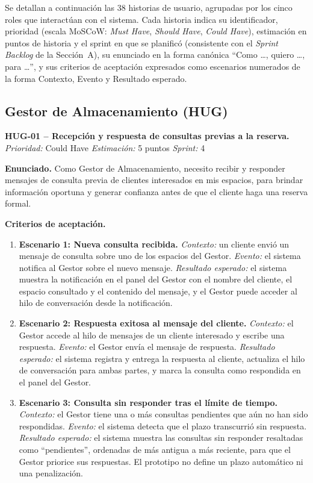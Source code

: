 \noindent Se detallan a continuación las 38 historias de usuario, agrupadas por los cinco roles que interactúan con el sistema. Cada historia indica su identificador, prioridad (escala MoSCoW: \textit{Must Have}, \textit{Should Have}, \textit{Could Have}), estimación en puntos de historia y el sprint en que se planificó (consistente con el \textit{Sprint Backlog} de la Sección~A), su enunciado en la forma canónica ``Como \ldots, quiero \ldots, para \ldots'', y sus criterios de aceptación expresados como escenarios numerados de la forma Contexto, Evento y Resultado esperado.

\subsection{Gestor de Almacenamiento (HUG)}

\textbf{HUG-01 -- Recepción y respuesta de consultas previas a la reserva.} \label{req:HUG-01}
\textit{Prioridad:} Could Have \quad \textit{Estimación:} 5 puntos \quad \textit{Sprint:} 4

\textbf{Enunciado.} Como Gestor de Almacenamiento, necesito recibir y responder mensajes de consulta previa de clientes interesados en mis espacios, para brindar información oportuna y generar confianza antes de que el cliente haga una reserva formal.

\textbf{Criterios de aceptación.}
\begin{enumerate}
\item \textbf{Escenario 1: Nueva consulta recibida.} \textit{Contexto:} un cliente envió un mensaje de consulta sobre uno de los espacios del Gestor. \textit{Evento:} el sistema notifica al Gestor sobre el nuevo mensaje. \textit{Resultado esperado:} el sistema muestra la notificación en el panel del Gestor con el nombre del cliente, el espacio consultado y el contenido del mensaje, y el Gestor puede acceder al hilo de conversación desde la notificación.
\item \textbf{Escenario 2: Respuesta exitosa al mensaje del cliente.} \textit{Contexto:} el Gestor accede al hilo de mensajes de un cliente interesado y escribe una respuesta. \textit{Evento:} el Gestor envía el mensaje de respuesta. \textit{Resultado esperado:} el sistema registra y entrega la respuesta al cliente, actualiza el hilo de conversación para ambas partes, y marca la consulta como respondida en el panel del Gestor.
\item \textbf{Escenario 3: Consulta sin responder tras el límite de tiempo.} \textit{Contexto:} el Gestor tiene una o más consultas pendientes que aún no han sido respondidas. \textit{Evento:} el sistema detecta que el plazo transcurrió sin respuesta. \textit{Resultado esperado:} el sistema muestra las consultas sin responder resaltadas como ``pendientes'', ordenadas de más antigua a más reciente, para que el Gestor priorice sus respuestas. El prototipo no define un plazo automático ni una penalización.
\end{enumerate}

